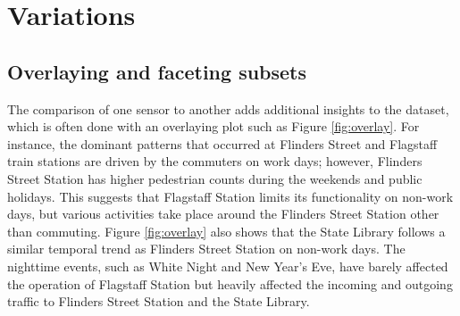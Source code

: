 \documentclass[article]{jss}
\theoremstyle{definition}
\theoremstyle{definition}
\theoremstyle{remark}
\begin{document}
\section{Variations}\label{variations}

\label{sec:examples}

\subsection{Overlaying and faceting
subsets}\label{overlaying-and-faceting-subsets}

The comparison of one sensor to another adds additional insights to the
dataset, which is often done with an overlaying plot such as Figure
\ref{fig:overlay}. For instance, the dominant patterns that occurred at
Flinders Street and Flagstaff train stations are driven by the commuters
on work days; however, Flinders Street Station has higher pedestrian
counts during the weekends and public holidays. This suggests that
Flagstaff Station limits its functionality on non-work days, but various
activities take place around the Flinders Street Station other than
commuting. Figure \ref{fig:overlay} also shows that the State Library
follows a similar temporal trend as Flinders Street Station on non-work
days. The nighttime events, such as White Night and New Year's Eve, have
barely affected the operation of Flagstaff Station but heavily affected
the incoming and outgoing traffic to Flinders Street Station and the
State Library.
\end{document}
